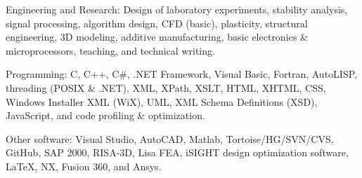 \documentclass{resume}
\begin{document}
    \begin{bulletedlist}
		
        \item Engineering and Research: Design of laboratory experiments,
                        stability analysis,
                        signal processing,
                        algorithm design,
                        CFD (basic),
                        plasticity,
                        structural engineering,
                        3D modeling,
                        additive manufacturing,
                        basic electronics \& microprocessors,
                        teaching,
                        and technical writing.
                        
        \item Programming: C,
                        C++,
                        C\#,
                        .NET Framework,
                        Visual Basic,
                        Fortran,
                        AutoLISP,
                        threading (POSIX \& .NET),
                        XML,
                        XPath,
                        XSLT,
                        HTML,
                        XHTML,
                        CSS,
                        Windows Installer XML (WiX),
                        UML,
                        XML Schema Definitions (XSD),
                        JavaScript,
                        and code profiling \& optimization.
                        
        \item Other software: Visual Studio,
                        AutoCAD,
                        Matlab,
                        Tortoise/HG/SVN/CVS,
                        GitHub,
                        SAP 2000,
                        RISA-3D,
                        Lisa FEA,
                        iSIGHT design optimization software,
                        LaTeX,
                        NX,
                        Fusion 360,
                        and Ansys.
                        
	\end{bulletedlist}
	

    
\end{document}

